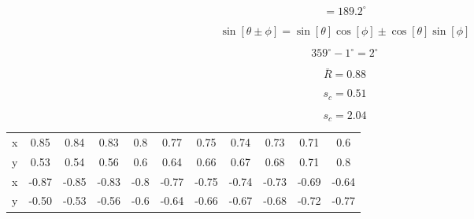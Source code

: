 \documentclass{article}
\begin{document}
\[
= 189.2^\circ
\]

\[
\sin[\theta\pm\phi] = \sin[\theta]\cos[\phi]\pm\cos[\theta]\sin[\phi]
\]

\[
359^\circ - 1^\circ = 2^\circ
\]

\[
\bar{R} = 0.88
\]

\[
s_c = 0.51
\]

\[
s_c = 2.04
\]

\begin{tabular}{c|cccccccccc}
x & 0.85 & 0.84 & 0.83 & 0.8 & 0.77 & 0.75 & 0.74 & 0.73 & 0.71 & 0.6 \\
y & 0.53 & 0.54 & 0.56 & 0.6 & 0.64 & 0.66 & 0.67 & 0.68 & 0.71 & 0.8 \\
\hline
x & -0.87 & -0.85 & -0.83 & -0.8 & -0.77 & -0.75 & -0.74 & -0.73 & -0.69 & -0.64 \\
y & -0.50 & -0.53 & -0.56 & -0.6 & -0.64 & -0.66 & -0.67 & -0.68 & -0.72 & -0.77 \\
\end{tabular}
\end{document}
